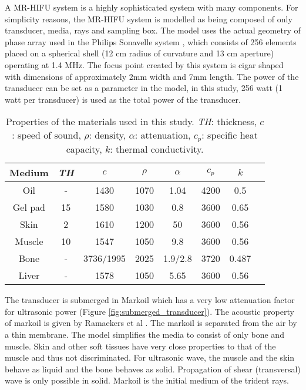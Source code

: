A MR-HIFU system is a highly sophisticated system with many components. For simplicity reasons, the MR-HIFU system is modelled as being composed of only transducer, media, rays and sampling box. The model uses the actual geometry of phase array used in the Philips Sonavelle system \cite{sonalleve}, which consists of 256 elements placed on a spherical shell (12 cm radius of curvature and 13 cm aperture) operating at 1.4 MHz. The focus point created by this system is cigar shaped with dimensions of approximately 2mm width and 7mm length. The power of the transducer can be set as a parameter in the model, in this study, 256 watt (1 watt per transducer) is used as the total power of the transducer. 

\begin{table}[h!]
    \centering
    \begin{tabular}{c c c c c c c c} 
        \hline
        Medium & \textit{TH} & $c$ & $\rho$ & $\alpha$ & $c_p$ & $k$ \\ [0.5ex] 
        \hline\hline
        Oil & - & 1430 & 1070 & 1.04 & 4200 & 0.5 \\
        \hline
        Gel pad & 15 & 1580 & 1030 & 0.8 & 3600 & 0.65 \\
        \hline
        Skin & 2 & 1610 & 1200 & 50 & 3600 & 0.56 \\
        \hline
        Muscle & 10 & 1547 & 1050 & 9.8 & 3600 & 0.56 \\
        \hline
        Bone & - & 3736/1995 & 2025 & 1.9/2.8 & 3720 & 0.487 \\
        \hline
        Liver & - & 1578 & 1050 & 5.65 & 3600 & 0.56 \\
        \hline
    \end{tabular}
    \caption{Properties of the materials used in this study. \textit{TH}: thickness,  $c$: speed of sound, $\rho$: density,  $\alpha$: attenuation, $c_p$: specific heat capacity, $k$: thermal conductivity. \cite{Modena_2018} \cite{markoil}}
    \label{tb:media_property}
\end{table}

The transducer is submerged in Markoil which has a very low attenuation factor for ultrasonic power (Figure \ref{fig:submerged_transducer}). The acoustic property of markoil is given by Ramaekers et al \cite{markoil}. The markoil is separated from the air by a thin membrane. The model simplifies the media to consist of only bone and muscle. Skin and other soft tissues have very close properties to that of the muscle and thus not discriminated. For ultrasonic wave, the muscle and the skin behave as liquid and the bone behaves as solid. Propagation of shear (transversal) wave is only possible in solid. Markoil is the initial medium of the trident rays. 

